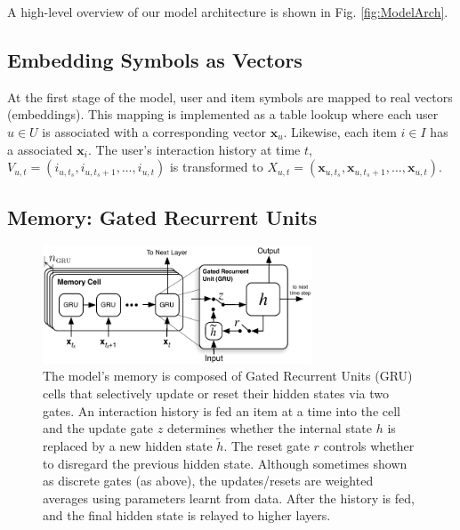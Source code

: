 \documentclass{sig-alternate-05-2015}
\newcommand{\mat}[1]{\mathbf{#1}}
\begin{document}
A high-level overview of our model architecture is shown in Fig. \ref{fig:ModelArch}. 

\subsection{Embedding Symbols as Vectors}
At the first stage of the model, user and item symbols are mapped to real  vectors (embeddings). This mapping is implemented as a table lookup where each user $u \in U$ is associated with a corresponding vector $\mat{x}_u$. Likewise, each item $i \in I$ has a associated $\mat{x}_i$. The user's interaction history at time $t$, $V_{u,t} = (i_{u,t_s}, i_{u,t_s + 1}, \dots, i_{u,t})$ is transformed to $X_{u,t} = (\mat{x}_{u,t_s}, \mat{x}_{u,t_s + 1}, \dots, \mat{x}_{u,t})$. 

\subsection{Memory: Gated Recurrent Units}
\begin{figure}
\centering
	\includegraphics[width=8cm]{images/GRU}
	\caption{The model's memory is composed of Gated Recurrent Units (GRU) cells that selectively update or reset their hidden states via two gates. An interaction history is fed an item at a time into the cell and the update gate $z$ determines whether the internal state $h$ is replaced by a new hidden state $\tilde{h}$. The reset gate $r$ controls whether to disregard the previous hidden state. Although sometimes shown as discrete gates (as above), the updates/resets are weighted averages using parameters learnt from data. After the history is fed, and the final hidden state is relayed to higher layers.}
	\label{fig:GRU}
\end{figure}
\end{document}
